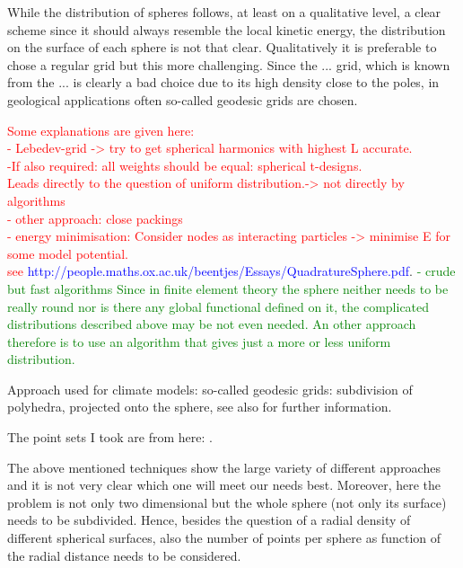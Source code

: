 While the distribution of spheres follows, at least on a qualitative level, a clear scheme since it should always resemble the local kinetic energy, the distribution on the surface of each sphere is not that clear.
Qualitatively it is preferable to chose a regular grid but this more challenging.
Since the ... grid, which is known from the ... is clearly a bad choice due to its high density close to the poles, in geological applications often so-called geodesic grids are chosen.

\textcolor{red}{
Some explanations are given here:\\ %
- Lebedev-grid -> try to get spherical harmonics with highest L accurate.\\
-If also required: all weights should be equal: spherical t-designs. \\
Leads directly to the question of uniform distribution.-> not directly by algorithms\\
- other approach: close packings \\
- energy minimisation: Consider nodes as interacting particles -> minimise E for some model potential.\\
see} \textcolor{blue}{http://people.maths.ox.ac.uk/beentjes/Essays/QuadratureSphere.pdf}.
\textcolor{green}{
- crude but fast algorithms
Since in finite element theory the sphere neither needs to be really round nor is there any global functional defined on it,
the complicated distributions described above may be not even needed. 
An other approach therefore is to use an algorithm that gives just a more or less uniform distribution.}

Approach used for climate models: so-called geodesic grids: subdivision of polyhedra, projected onto the sphere\cite{geodesic1, geodesic2}, see also
for further information.

The point sets I took are from here: %
\cite{womersley,fliegeMaier}.

The above mentioned techniques show the large variety of different approaches and it is not very clear which one will meet our needs best.
Moreover, here the problem is not only two dimensional but the whole sphere (not only its surface) needs to be subdivided. 
Hence, besides the question of a radial density of different spherical surfaces, also the number of points per sphere as function of the radial distance 
needs to be considered.

